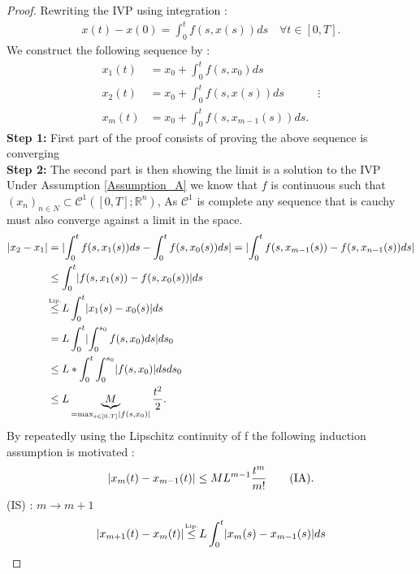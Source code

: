 \begin{proof}[Proof]
  Rewriting the IVP using integration : 
  \begin{align*}
    x(t) - x(0) = \int_0^{t }f(s,x(s)) ds   \quad \forall  t \in  [0,T]
  .\end{align*}
  We construct the following sequence by : 
  \begin{align*}
    x_1(t) &= x_0 + \int_0^{t }f(s,x_0) ds \\
    x_{2}(t) &= x_0 + \int_0^{t} f(s,x(s)) ds 
             &\vdots \\
    x_m(t) &= x_0 + \int_0^{t} f(s,x_{m-1}(s)) ds 
  .\end{align*}
  \textbf{Step 1:} First part of the proof consists of proving the above sequence is converging \\[0.5ex]
  \textbf{Step 2:} The second part is then showing the limit is a solution to the IVP\\[1ex]
  Under Assumption \ref{Assumption_A} we know that $f$ is continuous such that $(x_n)_{n \in  N} \subset \mathcal{C}^{1}([0,T];\mathbb{R}^{n} ) $, 
  As $\mathcal{C}^{1} $ is complete any sequence that is cauchy must also converge against a limit in the space. \\[1ex]
  \begin{align*}
    \abs{x_2 - x_1} &= \abs{\int_{0}^{t} f(s,x_{1}(s)) ds  -  \int_{0}^{t} f(s,x_{0}(s)) ds  } = \abs{\int_{0}^{t} f(s,x_{m-1}(s))  - f(s,x_{n-1}(s)) ds } \\
                    &\le \int_0^{t} \abs{f(s,x_{1}(s)) - f(s,x_{0}(s))} ds    \\ 
                    &\myS{Lip.}{\le }  L \int_0^{t} \abs{x_{1}(s) - x_{0}(s) } ds  \\
                    &= L \int_0^{t } \abs{\int_0^{s_0} f(s,x_0) ds} ds_0  \\
                    &\le L * \int_0^{t} \int_0^{s_0} \abs{f(s,x_0)} ds ds_0  \\
                    &\le L \underbrace{M}_{=\max_{s \in  [0,T]}\abs{f(s,x_0)}} \frac{t^2}{2}  
  .\end{align*}
  By repeatedly using  the Lipschitz continuity of f the following induction assumption is motivated : 
  \begin{align*}
    \lvert x_m(t) - x_{m-1}(t)\rvert \le M L^{m-1} \frac{t^m}{m!}  \tag{IA}
  .\end{align*}
  (IS) :  $m \to  m+1$
  \begin{align*}
    \abs{x_{m+1}(t) - x_{m}(t)} &\myS{Lip.}{\le }  L \int_0^{t} \abs{x_m(s)-x_{m-1}(s)} ds \\

\end{align*}
\end{proof}
